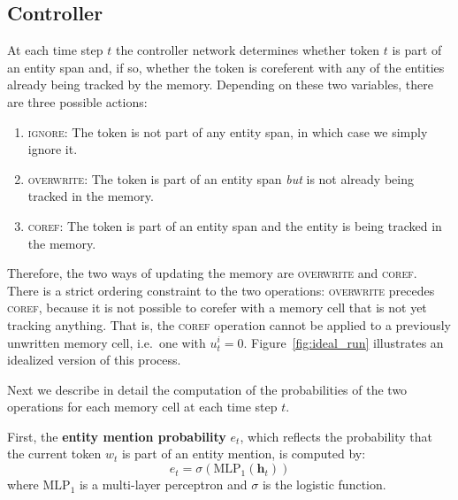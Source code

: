 \documentclass[11pt,a4paper]{article}
\newcommand{\actignore}{\textsc{ignore}\xspace}
\newcommand{\actcoref}{\textsc{coref}\xspace}
\newcommand{\actoverwrite}{\textsc{overwrite}\xspace}
\newcommand{\mlp}{\mathrm{MLP}}
\def\vec#1{\ensuremath{\boldsymbol{{#1}}}}
\begin{document}
\subsection{Controller}
At each time step $t$ the controller network determines whether token $t$ is part of an entity span and, if so, whether the token is coreferent with any of the entities already being tracked by the memory. Depending on these two
variables, there are three possible actions: \begin{enumerate}[label=(\roman*)]
\itemsep0em
\item \actignore: The token is not part of any entity span, in which case we simply ignore it.
\item \actoverwrite: The token is part of an entity span \emph{but} is not already being tracked in the memory.
\item \actcoref: The token is part of an entity span and the entity is being tracked in the memory.
\end{enumerate}
Therefore, the two ways of updating the memory are \actoverwrite and \actcoref.
There is a strict ordering constraint to the two operations: \actoverwrite precedes \actcoref, because it is not possible to corefer with a memory cell that is not yet tracking anything. That is, the \actcoref operation cannot be applied to a previously unwritten memory cell, i.e.~one with $u^i_t = 0$. Figure~\ref{fig:ideal_run} illustrates an idealized version of this process.

Next we describe in detail the computation of the probabilities of the two operations for each memory cell at each time step $t$.

First, the {\bf entity mention probability} $e_t$, which reflects the probability that the current token $w_t$ is part of an entity mention, is computed by:
\begin{equation} \label{ent_eqn}
e_t = \sigma(\mlp_1(\vec{h}_t))
\end{equation}
where $\mlp_1$ is a multi-layer perceptron and $\sigma$ is the logistic function.
\end{document}
